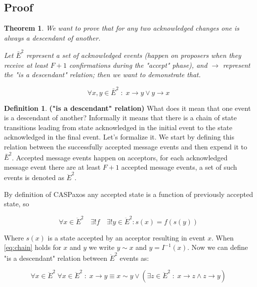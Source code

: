 \documentclass[12pt]{article}
\newtheorem{theorem}{Theorem}
\theoremstyle{definition}
\newtheorem*{definition}{Definition}
\begin{document}
\begin{appendices}
\section{Proof}
\label{appendix:proof}

\begin{theorem} \label{th:proof}
  We want to prove that for any two acknowledged changes one is always a descendant of another.
  
  Let $\bar{E}^2$ represent a set of acknowledged events (happen on proposers when they receive at least $F+1$ confirmations during the "accept" phase), and $\to$ represent the "is a descendant" relation; then we want to demonstrate that.

  \begin{equation}
    \forall x,y \in \bar{E}^2 \;:\; x \to y \lor y \to x
  \end{equation}
\end{theorem}

\theoremstyle{definition}
\begin{definition}{\bf("is a descendant" relation)}
  What does it mean that one event is a descendant of another? Informally it means that there is a chain of state transitions leading from state acknowledged in the initial event to the state acknowledged in the final event. Let's formalize it. We start by defining this relation between the successfully accepted message events and then expend it to $\bar{E}^2$. Accepted message events happen on acceptors, for each acknowledged message event there are at least $F+1$ accepted message events, a set of such events is denoted as $\ddot{E}^2$.

  By definition of CASPaxos any accepted state is a function of previously accepted state, so
  
  \begin{equation} \label{eq:chain}
    \forall x \in \ddot{E}^2 \quad \exists ! f \quad \exists ! y \in \ddot{E}^2 : s(x) = f(s(y))
  \end{equation}
  
  Where $s(x)$ is a state accepted by an acceptor resulting in event $x$. When \ref{eq:chain} holds for $x$ and $y$ we write $y \sim x$ and $y = I^{-1}(x)$. Now we can define "is a descendant" relation between $\ddot{E}^2$ events as:
  
  \begin{equation}
    \forall x \in \ddot{E}^2 \; \forall x \in \ddot{E}^2 \;:\; x \to y \equiv x \sim y \lor (\exists z \in \ddot{E}^2 \;:\; x \to z \land z \to y)
  \end{equation}
  

\end{definition}
\end{appendices}
\end{document}
